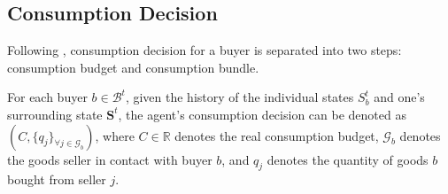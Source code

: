 
\subsection{Consumption Decision}

Following \citet*{HandbookABM}, consumption decision for a buyer is separated into two steps: consumption budget and consumption bundle. 
\begin{definition}
   For each buyer $b \in \mathcal{B}^t$, given the history of the individual
   states $S^t_b$ and one's surrounding state $\mathbf{S}^t$, the agent's
   consumption decision can be denoted as $(C, \{q_j\}_{\forall j \in
   \mathcal{G}_b})$, where $C\in \mathbb{R}$ denotes the real consumption
   budget, $\mathcal{G}_b$ denotes the goods seller in contact with buyer $b$,
   and $q_j$ denotes the quantity of goods $b$ bought from seller $j$.
\end{definition}


